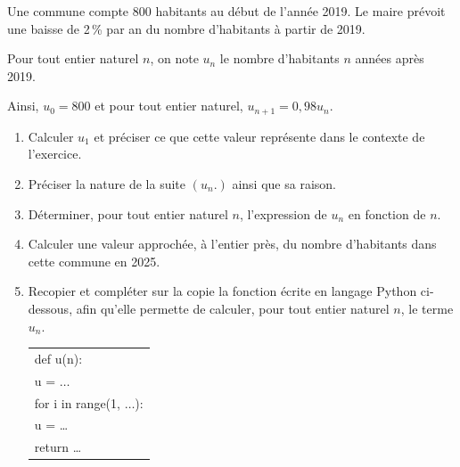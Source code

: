 \medskip

Une commune compte $800$ habitants au début de l'année 2019. Le maire prévoit une baisse de 2\,\% par an du nombre d'habitants à partir de 2019.

Pour tout entier naturel $n$, on note $u_n$ le nombre d'habitants $n$ années après 2019. 

Ainsi, $u_0 = 800$ et pour tout entier naturel, $u_{n+1}= 0,98u_n$.

\medskip

\begin{enumerate}
\item Calculer $u_1$ et préciser ce que cette valeur représente dans le contexte de l'exercice.
\item Préciser la nature de la suite $\left(u_n.\right)$ ainsi que sa raison.
\item Déterminer, pour tout entier naturel $n$, l'expression de $u_n$ en fonction de $n$.
\item Calculer une valeur approchée, à l'entier près, du nombre d'habitants dans cette commune en 2025.
\item Recopier et compléter sur la copie la fonction écrite en langage Python ci-dessous, afin qu'elle permette de calculer, pour tout entier naturel $n$, le terme $u_n$.

\begin{center}
\begin{tabular}[]{|l|}
\hline
def u(n):\\ 
\hspace{1.3em}	u = $\dots$\\
\hspace{1.3em}	for i in range(1, $\dots$):\\
\hspace{2.8em}  u = \dots \\
\hspace{1.3em}return \dots\\
\hline
\end{tabular}
\end{center}
\end{enumerate}

\vspace{0,5cm}
